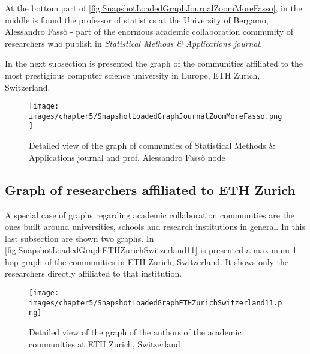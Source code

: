At the bottom part of \hyperref[fig:SnapshotLoadedGraphJournalZoomMoreFasso]{\autoref{fig:SnapshotLoadedGraphJournalZoomMoreFasso}}, in the middle is found the professor of statistics at the University of Bergamo, Alessandro Fassò - part of the enormous academic collaboration community of researchers who publish in \textit{Statistical Methods \& Applications journal}.

In the next subsection is presented the graph of the communities affiliated to the most prestigious computer science university in Europe, ETH Zurich, Switzerland.

\begin{figure}[H]%
	\centering%
	\texttt{[image: images/chapter5/SnapshotLoadedGraphJournalZoomMoreFasso.png]}%
	\caption[Detailed view of the graph of communities of Statistical Methods \& Applications journal and prof. Alessandro Fassò node]{Detailed view of the graph of communties of Statistical Methods \& Applications journal and prof. Alessandro Fassò node}%
	\label{fig:SnapshotLoadedGraphJournalZoomMoreFasso}%
\end{figure}%

\subsection{Graph of researchers affiliated to ETH Zurich} \label{subsection:Displayoftheresults/Indetailviewofthecollaborationgraph/GraphofresearchersaffiliatedtoETHZurich}
A special case of graphs regarding academic collaboration communities are the ones built around universities, schools and research institutions in general. In this last subsection are shown two graphs.
In \hyperref[fig:SnapshotLoadedGraphETHZurichSwitzerland11]{\autoref{fig:SnapshotLoadedGraphETHZurichSwitzerland11}} is presented a maximum 1 hop graph of the communities in ETH Zurich, Switzerland. It shows only the researchers directly affiliated to that institution.

\begin{figure}[H]%
	\centering%
	\texttt{[image: images/chapter5/SnapshotLoadedGraphETHZurichSwitzerland11.png]}%
	\caption[Detailed view of the graph of the authors of the academic communities at ETH Zurich, Switzerland]{Detailed view of the graph of the authors of the academic communities at ETH Zurich, Switzerland}%
	\label{fig:SnapshotLoadedGraphETHZurichSwitzerland11}%
\end{figure}%


